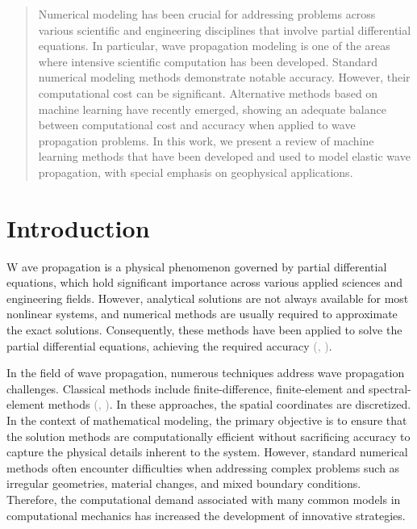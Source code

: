 \documentclass[11pt,twoside]{article}
\renewcommand{\citep}[2][]{\textcolor{gray}{(\citeauthor{#2}, \citeyear[#1]{#2})}}
\begin{document}
\begin{tcolorbox}[colback=gray!20, colframe=gray!20,sharp corners]

\begin{abstract}

\vspace{-1mm}

\noindent
Numerical modeling has been crucial for addressing problems across various scientific and engineering disciplines that involve partial differential equations. In particular, wave propagation modeling is one of the areas where intensive scientific computation has been developed. Standard numerical modeling methods demonstrate notable accuracy. However, their computational cost can be significant. Alternative methods based on machine learning have recently emerged, showing an adequate balance between computational cost and accuracy when applied to wave propagation problems. In this work, we present a review of machine learning methods that have been developed and used to model elastic wave propagation, with special emphasis on geophysical applications.
\end{abstract}
\end{tcolorbox}

 
\section*{Introduction}



\lettrine{W}{ }ave propagation is a physical phenomenon governed by partial differential equations, which hold significant importance across various applied sciences and engineering fields. However, analytical solutions are not always available for most nonlinear systems, and numerical methods are usually required to approximate the exact solutions. Consequently, these methods have been applied to solve the partial differential equations, achieving the required accuracy \citep{Seriani2020}.

In the field of wave propagation, numerous techniques address wave propagation challenges. Classical methods include finite-difference, finite-element and spectral-element methods \citep{Moczo, virieux_review_2011, Igel2017,komatitsch_introduction_1999,chaljub_spectral-element_2007}. In these approaches, the spatial coordinates are discretized. In the context of mathematical modeling, the primary objective is to ensure that the solution methods are computationally efficient without sacrificing accuracy to capture the physical details inherent to the system. However, standard numerical methods often encounter difficulties when addressing complex problems such as irregular geometries, material changes, and mixed boundary conditions. Therefore, the computational demand associated with many common models in computational mechanics has increased the development of innovative strategies.
\end{document}
